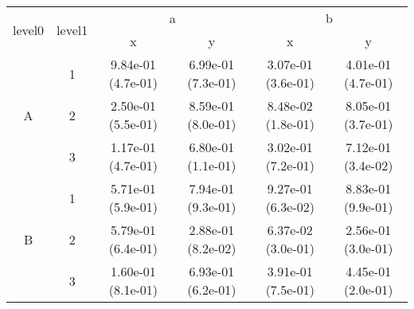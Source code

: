 \begin{tabular}{cccccc}
\toprule
\multirow{2}{*}{level0} & \multirow{2}{*}{level1}&\multicolumn{2}{c}{a}&\multicolumn{2}{c}{b}\tabularnewline
\cmidrule(lr){3-4}
\cmidrule(lr){5-6}
&&x&y&x&y\tabularnewline
\midrule
\multirow{3}{*}{A}&1& 9.84e-01 (4.7e-01)& 6.99e-01 (7.3e-01)& 3.07e-01 (3.6e-01)& 4.01e-01 (4.7e-01)\tabularnewline
&2& 2.50e-01 (5.5e-01)& 8.59e-01 (8.0e-01)& 8.48e-02 (1.8e-01)& 8.05e-01 (3.7e-01)\tabularnewline
&3& 1.17e-01 (4.7e-01)& 6.80e-01 (1.1e-01)& 3.02e-01 (7.2e-01)& 7.12e-01 (3.4e-02)\tabularnewline
\midrule
\multirow{3}{*}{B}&1& 5.71e-01 (5.9e-01)& 7.94e-01 (9.3e-01)& 9.27e-01 (6.3e-02)& 8.83e-01 (9.9e-01)\tabularnewline
&2& 5.79e-01 (6.4e-01)& 2.88e-01 (8.2e-02)& 6.37e-02 (3.0e-01)& 2.56e-01 (3.0e-01)\tabularnewline
&3& 1.60e-01 (8.1e-01)& 6.93e-01 (6.2e-01)& 3.91e-01 (7.5e-01)& 4.45e-01 (2.0e-01)\tabularnewline
\bottomrule
\end{tabular}
